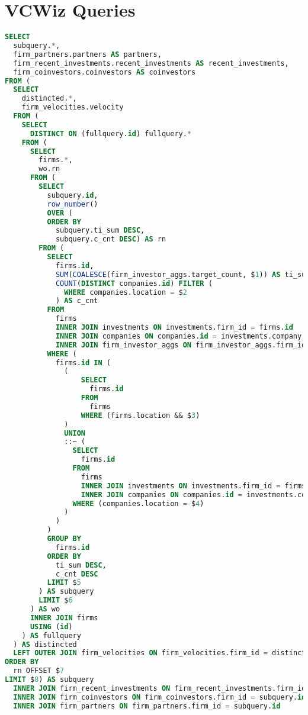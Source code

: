 \chapter{VCWiz Queries}

\begin{lstlisting}[frame=single,language=SQL,basicstyle=\tiny,columns=fullflexible,label={vcwiz:sql:query},caption={Firm Filter Query}]
SELECT
  subquery.*,
  firm_partners.partners AS partners,
  firm_recent_investments.recent_investments AS recent_investments,
  firm_coinvestors.coinvestors AS coinvestors
FROM (
  SELECT
    distincted.*,
    firm_velocities.velocity
  FROM (
    SELECT
      DISTINCT ON (fullquery.id) fullquery.*
    FROM (
      SELECT
        firms.*,
        wo.rn
      FROM (
        SELECT
          subquery.id,
          row_number()
          OVER (
          ORDER BY
            subquery.ti_sum DESC,
            subquery.c_cnt DESC) AS rn
        FROM (
          SELECT
            firms.id,
            SUM(COALESCE(firm_investor_aggs.target_count, $1)) AS ti_sum,
            COUNT(DISTINCT companies.id) FILTER (
              WHERE companies.location = $2
            ) AS c_cnt
          FROM
            firms
            INNER JOIN investments ON investments.firm_id = firms.id
            INNER JOIN companies ON companies.id = investments.company_id
            INNER JOIN firm_investor_aggs ON firm_investor_aggs.firm_id = firms.id
          WHERE (
            firms.id IN (
              (
                  SELECT
                    firms.id
                  FROM
                    firms
                  WHERE (firms.location && $3)
              )
              UNION
              ::~ (
                SELECT
                  firms.id
                FROM
                  firms
                  INNER JOIN investments ON investments.firm_id = firms.id
                  INNER JOIN companies ON companies.id = investments.company_id
                WHERE (companies.location = $4)
              )
            )
          )
          GROUP BY
            firms.id
          ORDER BY
            ti_sum DESC,
            c_cnt DESC
          LIMIT $5
        ) AS subquery
        LIMIT $6
      ) AS wo
      INNER JOIN firms
      USING (id)
    ) AS fullquery
  ) AS distincted
  LEFT OUTER JOIN firm_velocities ON firm_velocities.firm_id = distincted.id
ORDER BY
  rn OFFSET $7
LIMIT $8) AS subquery
  INNER JOIN firm_recent_investments ON firm_recent_investments.firm_id = subquery.id
  INNER JOIN firm_coinvestors ON firm_coinvestors.firm_id = subquery.id
  INNER JOIN firm_partners ON firm_partners.firm_id = subquery.id
\end{lstlisting}

